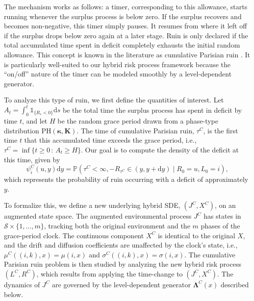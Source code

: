 \documentclass[11pt]{article}
\numberwithin{table}{section}
\numberwithin{figure}{section}
\numberwithin{equation}{section}
\newcommand{\dd}{\mathrm{d}}
\newcommand{\1}{{\mathbf 1}}
\newcommand{\0}{\mat{0}}
\begin{document}
The mechanism works as follows: a timer, corresponding to this allowance, starts running whenever the surplus process is below zero. If the surplus recovers and becomes non-negative, this timer simply pauses. It resumes from where it left off if the surplus drops below zero again at a later stage. Ruin is only declared if the total accumulated time spent in deficit completely exhausts the initial random allowance. This concept is known in the literature as cumulative Parisian ruin \cite{guerin2017distribution, bladt2019parisian}. It is particularly well-suited to our hybrid risk process framework because the ``on/off'' nature of the timer can be modeled smoothly by a level-dependent generator.

To analyze this type of ruin, we first define the quantities of interest. Let \(A_t = \int_0^t \mathds{1}_{\{R_s < 0\}} \dd s\) be the total time the surplus process has spent in deficit by time \(t\), and let \(H\) be the random grace period drawn from a phase-type distribution \(\mbox{PH}(\bm{\kappa}, \bm{K})\). The time of cumulative Parisian ruin, \(\tau^C\), is the first time \(t\) that this accumulated time exceeds the grace period, i.e., \(\tau^C = \inf\{t \ge 0 \,:\, A_t \ge H\}\). Our goal is to compute the density of the deficit at this time, given by
\[
\psi_i^C(u, y) \dd y = \mathbb{P}(\tau^C < \infty, -R_{\tau^C} \in (y, y+\dd y) \mid R_0 = u, L_0 = i),
\]
which represents the probability of ruin occurring with a deficit of approximately \(y\).

To formalize this, we define a new underlying hybrid SDE, \((J^C, X^C)\), on an augmented state space. The augmented environmental process \(J^C\) has states in \(\mathcal{S} \times \{1, \dots, m\}\), tracking both the original environment and the \(m\) phases of the grace-period clock. The continuous component \(X^C\) is identical to the original \(X\), and the drift and diffusion coefficients are unaffected by the clock's state, i.e., \(\mu^C((i,k), x) = \mu(i,x)\) and \(\sigma^C((i,k), x) = \sigma(i,x)\). The cumulative Parisian ruin problem is then studied by analyzing the new hybrid risk process \((L^C, R^C)\), which results from applying the time-change to \((J^C, X^C)\). The dynamics of \(J^C\) are governed by the level-dependent generator \(\bm{\Lambda}^C(x)\) described below.
\end{document}
